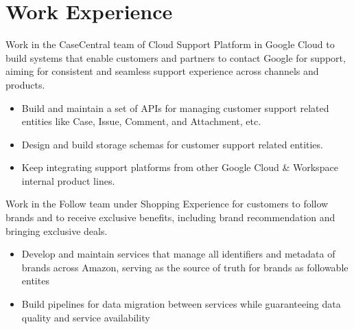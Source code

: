 \documentclass{resume}
\begin{document}
\section{Work Experience}
\begin{flushleft}
Work in the CaseCentral team of Cloud Support Platform in Google Cloud to build systems that enable customers and partners to contact Google for support, aiming for consistent and seamless support experience across channels and products.
\begin{itemize}
  \item Build and maintain a set of APIs for managing customer support related entities like Case, Issue, Comment, and Attachment, etc.
  \item Design and build storage schemas for customer support related entities.
  \item Keep integrating support platforms from other Google Cloud \& Workspace internal product lines.
\end{itemize}
\end{flushleft}
\begin{flushleft}
Work in the Follow team under Shopping Experience for customers to follow brands and to receive exclusive benefits, including brand recommendation and bringing exclusive deals.
\begin{itemize}
  \item Develop and maintain services that manage all identifiers and metadata of brands across Amazon, serving as the source of truth for brands as followable entites
  \item Build pipelines for data migration between services while guaranteeing data quality and service availability
\end{itemize}
\end{flushleft}
\end{document}
